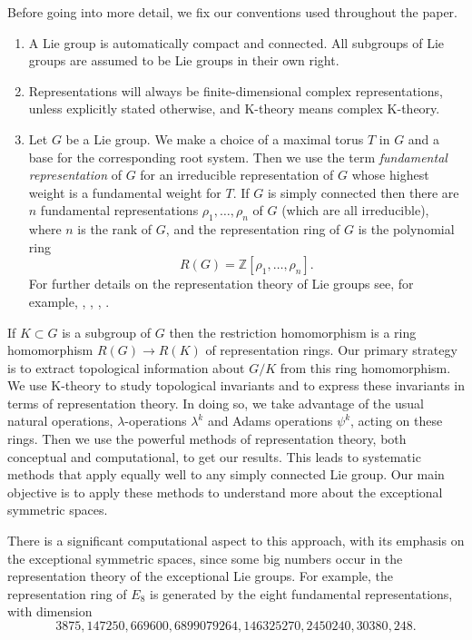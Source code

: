 \documentclass[twoside,a4paper,reqno,11pt]{amsart}
\newcommand{\K}{\mathrm{K}}
\newcommand{\Z}{\mathbb{Z}}
\begin{document}
Before going into more detail, we fix our conventions used throughout the paper. 
\begin{enumerate}
\item A Lie group is automatically compact and connected. All subgroups of Lie groups are assumed to be Lie groups in their own right.
\item Representations will always be finite-dimensional complex representations, unless explicitly stated otherwise, and $\K$-theory means complex $\K$-theory.  
\item Let $G$ be a Lie group. We make a choice of a maximal torus $T$ in $G$ and a base for the corresponding root system. Then we use the term {\em fundamental representation} of $G$ for an irreducible representation of $G$ whose highest weight is a fundamental weight for $T$. If $G$ is simply connected then there are $n$ fundamental representations $\rho_1, \dots, \rho_n$ of $G$ (which are all irreducible), where $n$ is the rank of $G$, and the representation ring of $G$ is the polynomial ring
$$
R(G) = \Z[\rho_1, \dots, \rho_n].
$$
For further details on the representation theory of Lie groups see, for example, \cite[Chapters~4, 6 and 7]{MR252560}, \cite[Chapters~13 and 14]{MR1249482}, \cite{MR1428422}, \cite{MR1153249}. 
\end{enumerate}

If $K \subset G$ is a subgroup of $G$ then the restriction homomorphism is a ring homomorphism $R(G) \to R(K)$ of representation rings.  Our primary strategy is to extract topological information about $G/K$ from this ring homomorphism.  We use $\K$-theory to study topological invariants and to express these invariants in terms of representation theory. In doing so, we take advantage of the usual natural operations, $\lambda$-operations $\lambda^k$ and Adams operations $\psi^k$, acting on these rings. Then we use the powerful methods of representation theory, both conceptual and computational, to get our results.  This leads to systematic methods that apply equally well to any simply connected Lie group. Our main objective is to apply these methods to understand more about the exceptional symmetric spaces. 

There is a significant computational aspect to this approach, with its emphasis on the exceptional symmetric spaces, since some big numbers occur in the representation theory of the exceptional Lie groups.  For example, the representation ring of $E_8$ is generated by the eight fundamental representations, with dimension
$$
3875, 147250, 669600, 6899079264, 146325270, 2450240, 30380, 248.
$$
\end{document}
